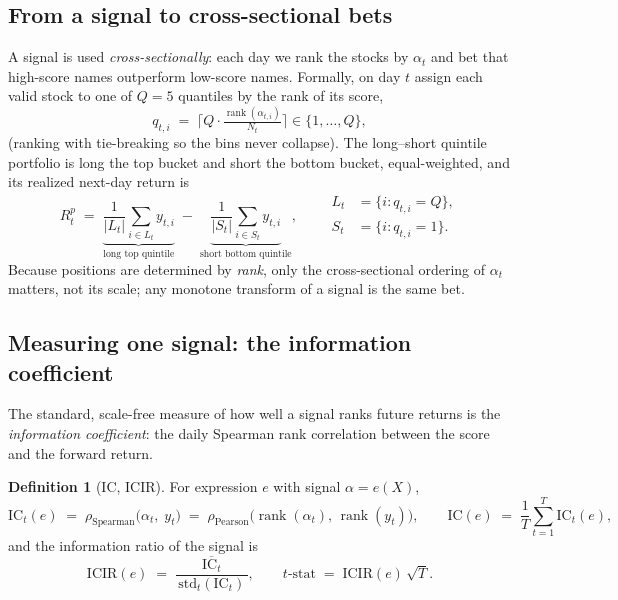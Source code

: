\documentclass[11pt]{article}
\theoremstyle{definition}
\newtheorem{definition}{Definition}[section]
\theoremstyle{plain}
\theoremstyle{remark}
\newcommand{\IC}{\mathrm{IC}}
\newcommand{\ICIR}{\mathrm{ICIR}}
\newcommand{\rank}{\operatorname{rank}}
\begin{document}
\subsection{From a signal to cross-sectional bets}
\label{sec:sorting}

A signal is used \emph{cross-sectionally}: each day we rank the stocks by $\alpha_t$
and bet that high-score names outperform low-score names. Formally, on day $t$ assign
each valid stock to one of $Q=5$ quantiles by the rank of its score,
\[
q_{t,i} \;=\; \Big\lceil Q \cdot \tfrac{\rank(\alpha_{t,i})}{N_t} \Big\rceil \in \{1,\dots,Q\},
\]
(ranking with tie-breaking so the bins never collapse). The long--short quintile
portfolio is long the top bucket and short the bottom bucket, equal-weighted, and its
realized next-day return is
\begin{equation}
R^{p}_{t}
\;=\;
\underbrace{\frac{1}{|L_t|}\sum_{i\in L_t} y_{t,i}}_{\text{long top quintile}}
\;-\;
\underbrace{\frac{1}{|S_t|}\sum_{i\in S_t} y_{t,i}}_{\text{short bottom quintile}},
\qquad
\begin{aligned}
L_t &= \{i: q_{t,i}=Q\},\\
S_t &= \{i: q_{t,i}=1\}.
\end{aligned}
\label{eq:lsret}
\end{equation}
Because positions are determined by \emph{rank}, only the cross-sectional ordering of
$\alpha_t$ matters, not its scale; any monotone transform of a signal is the same bet.

\subsection{Measuring one signal: the information coefficient}
\label{sec:ic}

The standard, scale-free measure of how well a signal ranks future returns is the
\emph{information coefficient}: the daily Spearman rank correlation between the score
and the forward return.

\begin{definition}[IC, ICIR]
For expression $e$ with signal $\alpha=e(X)$,
\begin{equation}
\IC_t(e) \;=\; \rho_{\text{Spearman}}\!\big(\alpha_t,\; y_t\big)
\;=\; \rho_{\text{Pearson}}\!\big(\rank(\alpha_t),\, \rank(y_t)\big),
\qquad
\IC(e) \;=\; \frac{1}{T}\sum_{t=1}^{T}\IC_t(e),
\label{eq:ic}
\end{equation}
and the information ratio of the signal is
\begin{equation}
\ICIR(e) \;=\; \frac{\overline{\IC_t}}{\,\mathrm{std}_t(\IC_t)\,},
\qquad
t\text{-stat} \;=\; \ICIR(e)\,\sqrt{T}.
\label{eq:icir}
\end{equation}
\end{definition}
\end{document}
